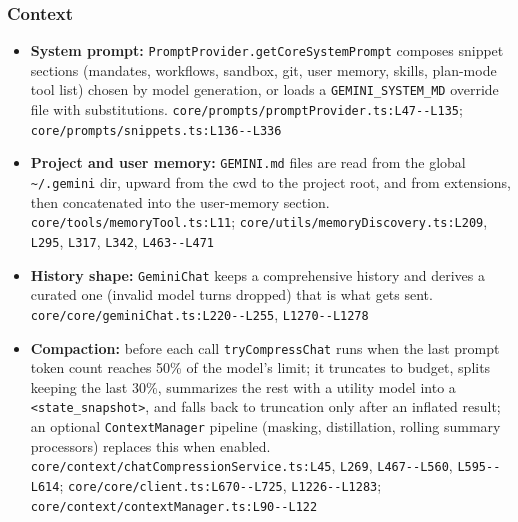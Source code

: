 \subsubsection*{Context}
\begin{itemize}
\item \textbf{System prompt:} \texttt{PromptProvider.\allowbreak{}getCoreSystemPrompt} composes snippet sections (mandates, workflows, sandbox, git, user memory, skills, plan-mode tool list) chosen by model generation, or loads a \texttt{GEMINI\_\allowbreak{}SYSTEM\_\allowbreak{}MD} override file with substitutions. \texttt{core/\allowbreak{}prompts/\allowbreak{}promptProvider.\allowbreak{}ts:\allowbreak{}L47-\allowbreak{}-\allowbreak{}L135}; \texttt{core/\allowbreak{}prompts/\allowbreak{}snippets.\allowbreak{}ts:\allowbreak{}L136-\allowbreak{}-\allowbreak{}L336}
\item \textbf{Project and user memory:} \texttt{GEMINI.\allowbreak{}md} files are read from the global \texttt{\textasciitilde{}/\allowbreak{}.\allowbreak{}gemini} dir, upward from the cwd to the project root, and from extensions, then concatenated into the user-memory section. \texttt{core/\allowbreak{}tools/\allowbreak{}memoryTool.\allowbreak{}ts:\allowbreak{}L11}; \texttt{core/\allowbreak{}utils/\allowbreak{}memoryDiscovery.\allowbreak{}ts:\allowbreak{}L209}, \texttt{L295}, \texttt{L317}, \texttt{L342}, \texttt{L463-\allowbreak{}-\allowbreak{}L471}
\item \textbf{History shape:} \texttt{GeminiChat} keeps a comprehensive history and derives a curated one (invalid model turns dropped) that is what gets sent. \texttt{core/\allowbreak{}core/\allowbreak{}geminiChat.\allowbreak{}ts:\allowbreak{}L220-\allowbreak{}-\allowbreak{}L255}, \texttt{L1270-\allowbreak{}-\allowbreak{}L1278}
\item \textbf{Compaction:} before each call \texttt{tryCompressChat} runs when the last prompt token count reaches 50\% of the model's limit; it truncates to budget, splits keeping the last 30\%, summarizes the rest with a utility model into a \texttt{<state\_\allowbreak{}snapshot>}, and falls back to truncation only after an inflated result; an optional \texttt{ContextManager} pipeline (masking, distillation, rolling summary processors) replaces this when enabled. \texttt{core/\allowbreak{}context/\allowbreak{}chatCompressionService.\allowbreak{}ts:\allowbreak{}L45}, \texttt{L269}, \texttt{L467-\allowbreak{}-\allowbreak{}L560}, \texttt{L595-\allowbreak{}-\allowbreak{}L614}; \texttt{core/\allowbreak{}core/\allowbreak{}client.\allowbreak{}ts:\allowbreak{}L670-\allowbreak{}-\allowbreak{}L725}, \texttt{L1226-\allowbreak{}-\allowbreak{}L1283}; \texttt{core/\allowbreak{}context/\allowbreak{}contextManager.\allowbreak{}ts:\allowbreak{}L90-\allowbreak{}-\allowbreak{}L122}

\end{itemize}
